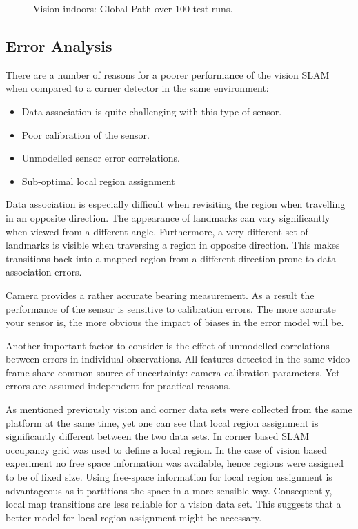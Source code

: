 \begin{figure}[htbp]
  \centering
  \caption{Vision indoors: Global Path over 100 test runs.}
  \label{fig:edge_odo_all}
\end{figure}



\subsection{Error Analysis}

There are a number of reasons for a poorer performance of the vision
SLAM when compared to a corner detector in the same environment:

\begin{itemize}
\item Data association is quite challenging with this type of
sensor. 
\item Poor calibration of the sensor.
\item Unmodelled sensor error correlations.
\item Sub-optimal local region assignment
\end{itemize}

Data association is especially difficult when revisiting the region
when travelling in an opposite direction. The appearance of landmarks
can vary significantly when viewed from a different
angle. Furthermore, a very different set of landmarks is visible when
traversing a region in opposite direction. This makes transitions back
into a mapped region from a different direction prone to data
association errors.

Camera provides a rather accurate bearing measurement. As a result the
performance of the sensor is sensitive to calibration errors. The more
accurate your sensor is, the more obvious the impact of biases in the
error model will be.

Another important factor to consider is the effect of unmodelled
correlations between errors in individual observations. All features
detected in the same video frame share common source of uncertainty:
camera calibration parameters. Yet errors are assumed independent for
practical reasons.

As mentioned previously vision and corner data sets were collected from
the same platform at the same time, yet one can see that local region
assignment is significantly different between the two data sets. In
corner based SLAM occupancy grid was used to define a local region. In
the case of vision based experiment no free space information was
available, hence regions were assigned to be of fixed size. Using
free-space information for local region assignment is advantageous as it
partitions the space in a more sensible way. Consequently, local map
transitions are less reliable for a vision data set. This suggests that
a better model for local region assignment might be necessary.




